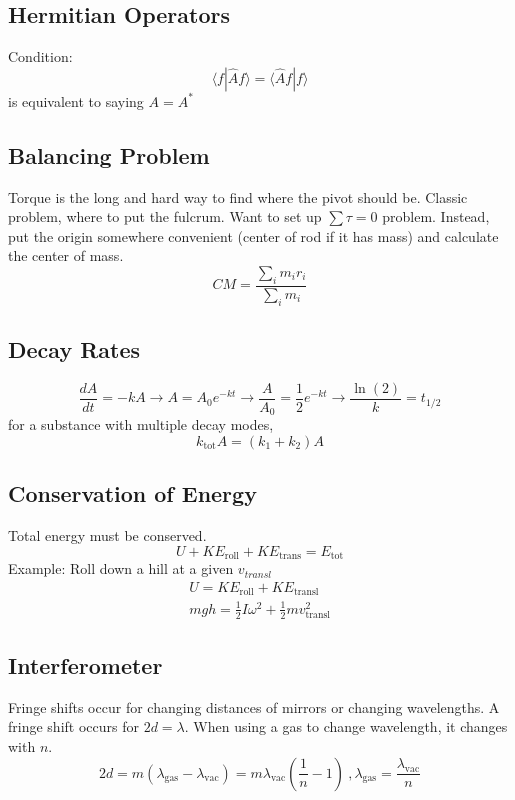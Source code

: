 \documentclass[10pt,a4paper]{article}
\begin{document}
\subsection{Hermitian Operators}
Condition:
\begin{equation}
 \langle f | \hat{A} f\rangle = \langle \hat{A} f | f \rangle 
\end{equation}
 is equivalent to saying $A=A^*$

\subsection{Balancing Problem}
Torque is the long and hard way to find where the pivot should be. Classic problem, where to put the fulcrum. Want to set up $\sum \tau = 0$ problem. Instead, put the origin somewhere convenient (center of rod if it has mass) and calculate the center of mass.
\begin{equation}
 CM = \frac{\sum \limits_i m_i r_i}{\sum \limits_i m_i} 
\end{equation}

\subsection{Decay Rates}
\begin{equation}
 \frac{dA}{dt} = -kA \rightarrow A = A_0 e^{-kt} \rightarrow \frac{A}{A_0} = \frac{1}{2}e^{-kt} \rightarrow \frac{\ln(2)}{k} = t_{1/2}
\end{equation}
for a substance with multiple decay modes,
\begin{equation}
 k_{\textrm{tot}} A = (k_1 + k_2)A 
\end{equation}

\subsection{Conservation of Energy}
Total energy must be conserved.
\begin{equation}
 U + KE_{\textrm{roll}} + KE_{\textrm{trans}} = E_{\textrm{tot}} 
\end{equation}
Example: Roll down a hill at a given $v_{transl}$
\begin{align}
 U = KE_{\textrm{roll}} + KE_{\textrm{transl}}\\
mgh = \frac{1}{2}I\omega^2 + \frac{1}{2}mv_{\textrm{transl}}^2
\end{align}

\subsection{Interferometer}
Fringe shifts occur for changing distances of mirrors or changing wavelengths. A fringe shift occurs for $2d=\lambda$. When using a gas to change wavelength, it changes with $n$.
\begin{equation}
 2d = m(\lambda_{\textrm{gas}} - \lambda_{\textrm{vac}}) = m\lambda_{\textrm{vac}}\left( \frac{1}{n} - 1\right)~,\lambda_{\textrm{gas}} = \frac{\lambda_{\textrm{vac}}}{n}
\end{equation}
\end{document}
